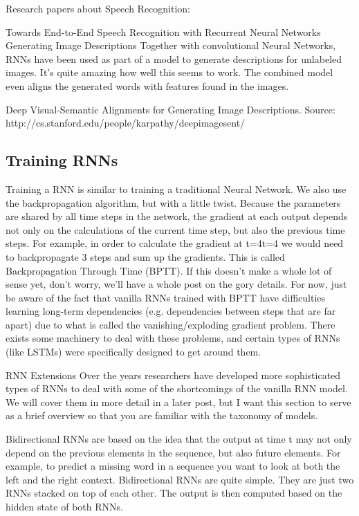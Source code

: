 Research papers about Speech Recognition:

Towards End-to-End Speech Recognition with Recurrent Neural Networks
Generating Image Descriptions
Together with convolutional Neural Networks, RNNs have been used as part of a model to generate descriptions for unlabeled images. It’s quite amazing how well this seems to work. The combined model even aligns the generated words with features found in the images.


Deep Visual-Semantic Alignments for Generating Image Descriptions. Source: http://cs.stanford.edu/people/karpathy/deepimagesent/

\subsection{Training RNNs}

Training a RNN is similar to training a traditional Neural Network. We also use the backpropagation algorithm, but with a little twist. Because the parameters are shared by all time steps in the network, the gradient at each output depends not only on the calculations of the current time step, but also the previous time steps. For example, in order to calculate the gradient at t=4t=4 we would need to backpropagate 3 steps and sum up the gradients. This is called Backpropagation Through Time (BPTT). If this doesn’t make a whole lot of sense yet, don’t worry, we’ll have a whole post on the gory details. For now, just be aware of the fact that vanilla RNNs trained with BPTT have difficulties learning long-term dependencies (e.g. dependencies between steps that are far apart) due to what is called the vanishing/exploding gradient problem. There exists some machinery to deal with these problems, and certain types of RNNs (like LSTMs) were specifically designed to get around them.

RNN Extensions
Over the years researchers have developed more sophisticated types of RNNs to deal with some of the shortcomings of the vanilla RNN model. We will cover them in more detail in a later post, but I want this section to serve as a brief overview so that you are familiar with the taxonomy of models.

Bidirectional RNNs are based on the idea that the output at time t may not only depend on the previous elements in the sequence, but also future elements. For example, to predict a missing word in a sequence you want to look at both the left and the right context. Bidirectional RNNs are quite simple. They are just two RNNs stacked on top of each other. The output is then computed based on the hidden state of both RNNs.

